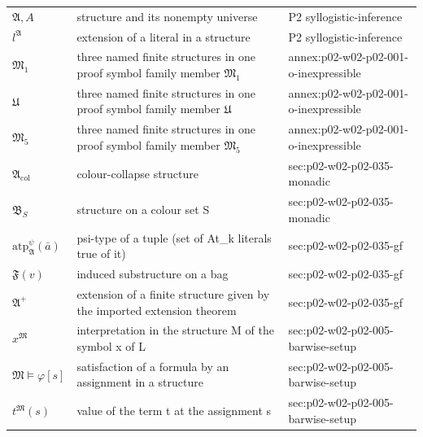 \begin{longtable}{@{}p{}p{}p{}@{}}
\(\mathfrak A,\allowbreak A\) & structure and its nonempty universe & P2 syllogistic-\allowbreak{}inference \\
\(l^{\mathfrak A}\) & extension of a literal in a structure & P2 syllogistic-\allowbreak{}inference \\
\(\mathfrak M_1\) & three named finite structures in one proof symbol family member \(\mathfrak M_1\) & annex:\allowbreak{}p02-\allowbreak{}w02-\allowbreak{}p02-\allowbreak{}001-\allowbreak{}o-\allowbreak{}inexpressible \\
\(\mathfrak U\) & three named finite structures in one proof symbol family member \(\mathfrak U\) & annex:\allowbreak{}p02-\allowbreak{}w02-\allowbreak{}p02-\allowbreak{}001-\allowbreak{}o-\allowbreak{}inexpressible \\
\(\mathfrak M_5\) & three named finite structures in one proof symbol family member \(\mathfrak M_5\) & annex:\allowbreak{}p02-\allowbreak{}w02-\allowbreak{}p02-\allowbreak{}001-\allowbreak{}o-\allowbreak{}inexpressible \\
\(\mathfrak A_{\mathrm{col}}\) & colour-collapse structure & sec:\allowbreak{}p02-\allowbreak{}w02-\allowbreak{}p02-\allowbreak{}035-\allowbreak{}monadic \\
\(\mathfrak B_S\) & structure on a colour set S & sec:\allowbreak{}p02-\allowbreak{}w02-\allowbreak{}p02-\allowbreak{}035-\allowbreak{}monadic \\
\(\mathrm{atp}^{\psi}_{\mathfrak A}(\bar a)\) & psi-type of a tuple (set of At\_k literals true of it) & sec:\allowbreak{}p02-\allowbreak{}w02-\allowbreak{}p02-\allowbreak{}035-\allowbreak{}gf \\
\(\mathfrak F(v)\) & induced substructure on a bag & sec:\allowbreak{}p02-\allowbreak{}w02-\allowbreak{}p02-\allowbreak{}035-\allowbreak{}gf \\
\(\mathfrak A^{+}\) & extension of a finite structure given by the imported extension theorem & sec:\allowbreak{}p02-\allowbreak{}w02-\allowbreak{}p02-\allowbreak{}035-\allowbreak{}gf \\
\(x^{\mathfrak M}\) & interpretation in the structure M of the symbol x of L & sec:\allowbreak{}p02-\allowbreak{}w02-\allowbreak{}p02-\allowbreak{}005-\allowbreak{}barwise-\allowbreak{}setup \\
\(\mathfrak M\models\varphi[s]\) & satisfaction of a formula by an assignment in a structure & sec:\allowbreak{}p02-\allowbreak{}w02-\allowbreak{}p02-\allowbreak{}005-\allowbreak{}barwise-\allowbreak{}setup \\
\(t^{\mathfrak M}(s)\) & value of the term t at the assignment s & sec:\allowbreak{}p02-\allowbreak{}w02-\allowbreak{}p02-\allowbreak{}005-\allowbreak{}barwise-\allowbreak{}setup \\

\end{longtable}
